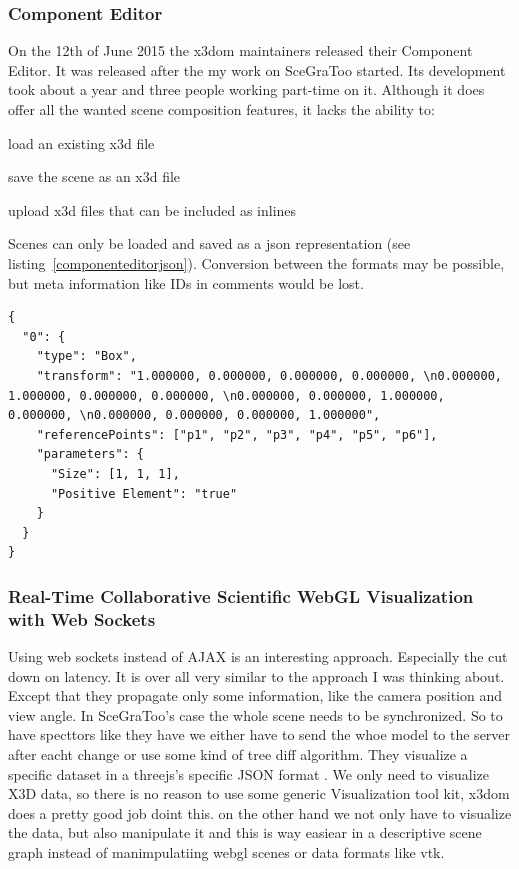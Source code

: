 \clearpage

\subsubsection{Component Editor}
\label{component-editor30}

On the 12th of June 2015 the x3dom maintainers released their Component Editor. \cite{componenteditor}
It was released after the my work on SceGraToo started.
Its development took about a year and three people working part-time on it. \cite{componenteditoreffort}
Although it does offer all the wanted scene composition features, it lacks the ability to:

\begin{itemize*}
  \item load an existing x3d file
  \item save the scene as an x3d file
  \item upload x3d files that can be included as inlines
\end{itemize*}

Scenes can only be loaded and saved as a json representation (see listing~\ref{componenteditorjson}).
Conversion between the formats may be possible, but meta information like IDs in comments would be lost.

\begin{listing}
  \begin{verbatim}
{
  "0": {
    "type": "Box",
    "transform": "1.000000, 0.000000, 0.000000, 0.000000, \n0.000000, 1.000000, 0.000000, 0.000000, \n0.000000, 0.000000, 1.000000, 0.000000, \n0.000000, 0.000000, 0.000000, 1.000000",
    "referencePoints": ["p1", "p2", "p3", "p4", "p5", "p6"],
    "parameters": {
      "Size": [1, 1, 1],
      "Positive Element": "true"
    }
  }
}
  \end{verbatim}
  \caption{}
  \label{componenteditorjson}
\end{listing}

\subsubsection{Real-Time Collaborative Scientific WebGL Visualization with Web Sockets}
\label{rtcswvwws}

Using web sockets instead of AJAX is an interesting approach. \cite{Marion:2012:RCS:2338714.2338721} Especially
the cut down on latency. It is over all very similar to the approach I
was thinking about. Except that they propagate only some information,
like the camera position and view angle. In SceGraToo's case the whole
scene needs to be synchronized. So to have specttors like they have we
either have to send the whoe model to the server after eacht change or
use some kind of tree diff algorithm. They visualize a specific dataset
in a threejs's specific JSON format \cite{threejs-format}. We only need to visualize X3D
data, so there is no reason to use some generic Visualization tool kit,
x3dom does a pretty good job doint this. on the other hand we not only
have to visualize the data, but also manipulate it and this is way
easiear in a descriptive scene graph instead of manimpulatiing webgl
scenes or data formats like vtk.

